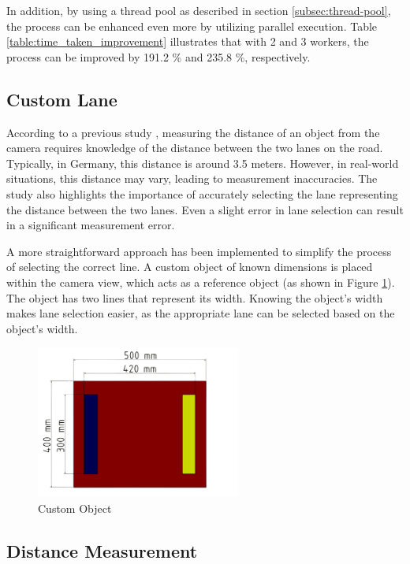 In addition, by using a thread pool as described in section \ref{subsec:thread-pool}, the process can be enhanced even more by utilizing parallel execution. Table \ref{table:time_taken_improvement} illustrates that with 2 and 3 workers, the process can be improved by 191.2 \% and 235.8 \%, respectively.


\subsection{Custom Lane}
\label{subsec:custom_lane}
According to a previous study \cite{Sabtu_2023}, measuring the distance of an object from the camera requires knowledge of the distance between the two lanes on the road. Typically, in Germany, this distance is around 3.5 meters. However, in real-world situations, this distance may vary, leading to measurement inaccuracies. The study also highlights the importance of accurately selecting the lane representing the distance between the two lanes. Even a slight error in lane selection can result in a significant measurement error.

A more straightforward approach has been implemented to simplify the process of selecting the correct line. A custom object of known dimensions is placed within the camera view, which acts as a reference object (as shown in Figure \ref{fig:custom_object}). The object has two lines that represent its width. Knowing the object's width makes lane selection easier, as the appropriate lane can be selected based on the object's width.

\begin{figure}[!ht]
    \centering
    \includegraphics[width=0.6\textwidth]{texs/Part2/chapter4/image/matdimension.png}
    \caption{Custom Object}
    \label{fig:custom_object}
\end{figure}

\subsection{Distance Measurement}
\label{subsec:distance_measurement}

